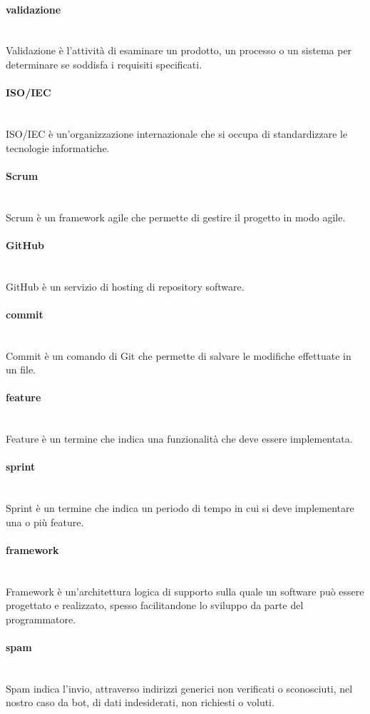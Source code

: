 \paragraph{validazione}~\smallskip \\
Validazione è l'attività di esaminare un prodotto, un processo o un sistema per determinare se soddisfa i requisiti specificati.

\paragraph{ISO/IEC}~\smallskip \\
ISO/IEC è un'organizzazione internazionale che si occupa di standardizzare le tecnologie informatiche.

\paragraph{Scrum}~\smallskip \\
Scrum è un framework agile che permette di gestire il progetto in modo agile.

\paragraph{GitHub}~\smallskip \\
GitHub è un servizio di hosting di repository software.

\paragraph{commit}~\smallskip \\
Commit è un comando di Git che permette di salvare le modifiche effettuate in un file.

\paragraph{feature}~\smallskip \\
Feature è un termine che indica una funzionalità che deve essere implementata.

\paragraph{sprint}~\smallskip \\
Sprint è un termine che indica un periodo di tempo in cui si deve implementare una o più feature.

\paragraph{framework}~\smallskip \\
Framework è un'architettura logica di supporto sulla quale un software può essere progettato e realizzato, spesso facilitandone lo sviluppo da parte del programmatore.

\paragraph{spam}~\smallskip \\
Spam indica l'invio, attraverso indirizzi generici non verificati o sconosciuti, nel nostro caso da bot, di dati indesiderati, non richiesti o voluti.

